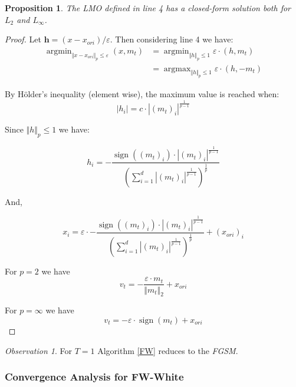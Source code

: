 \documentclass[10pt,twocolumn,letterpaper, english]{article}
\newcommand{\sign}{\mathop{\mathrm{sign}}}
\newcommand{\argmin}{\mathop{\mathrm{argmin}}}
\newcommand{\argmax}{\mathop{\mathrm{argmax}}}
\theoremstyle{definition}
\theoremstyle{plain}
\theoremstyle{plain}
\theoremstyle{plain}
\theoremstyle{plain}
\newtheorem{prop}{Proposition}[subsection]
\theoremstyle{remark}
\newtheorem{osservazione}{Observation}[section]
\theoremstyle{remark}
\theoremstyle{definition}
\theoremstyle{definition}
\theoremstyle{definition}
\theoremstyle{definition}
\renewcommand{\epsilon}{\varepsilon}
\begin{document}
\begin{prop}The LMO defined in line 4 has a closed-form solution both for $L_2$ and $L_\infty$. \\
\end{prop}
\begin{proof}
Let $\textbf{h}=(x - x_{ori})/ \epsilon$. Then considering line 4 we have:
\begin{align*}
    \argmin_{\Vert x - x_{ori} \Vert_p \le \epsilon} (x, m_t) &= \argmin_{\Vert h \Vert_p \le 1} \epsilon \cdot (h,m_t)\\
    &= \argmax_{\Vert h \Vert_p \le 1} \epsilon \cdot(h, -m_t)
\end{align*}

By H\"{o}lder's inequality (element wise), the maximum value is reached when: 
\begin{equation*}
    \left | h_i \right | = c \cdot \left | (m_t)_i \right |^{\frac{1}{p-1}}
\end{equation*}

Since $\Vert h \Vert_p \le 1$ we have:

\begin{equation*}
    h_i= - \frac{\sign((m_t)_i)\cdot \left | (m_t)_i \right |^{\frac{1}{p-1}}}{(\sum_{i=1}^d \left | (m_t)_i \right |^{\frac{1}{p-1}} )^{\frac{1}{p}}}
\end{equation*}

And,


\begin{equation*}
      x_i=\epsilon \cdot - \frac{\sign((m_t)_i)\cdot \left | (m_t)_i \right |^{\frac{1}{p-1}}}{(\sum_{i=1}^d \left | (m_t)_i \right |^{\frac{1}{p-1}} )^{\frac{1}{p}}} + (x_{ori})_i
\end{equation*}

For $p=2$ we have
\begin{equation*}
    v_t= - \frac{\epsilon \cdot m_t}{\Vert m_t \Vert_2} + x _{ori}
\end{equation*}

For $p= \infty$ we have
\begin{equation*}
    v_t = - \epsilon \cdot \sign(m_t) + x_{ori}
\end{equation*}
\end{proof}

\begin{osservazione}
For $T=1$ Algorithm \ref{FW} reduces to the \textit{FGSM}.
\end{osservazione}

\subsubsection{Convergence Analysis for FW-White}
\end{document}
